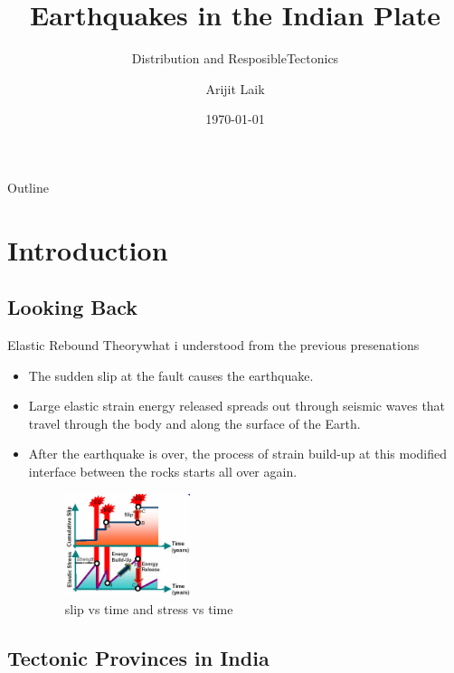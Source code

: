\documentclass[smaller]{beamer}
\title{Earthquakes in the Indian Plate}
\subtitle{Distribution and ResposibleTectonics}
\author[a class presentation by Arijit Laik]{Arijit Laik}
\institute[ Presidency University Kolkata ] %
{
  UG Semester VI\\
  Department of Geology\\
  Presidency University Kolkata 
}
\date{\today}
\begin{document}
\begin{frame}
  \titlepage
\end{frame}

\begin{frame}{Outline}
  \tableofcontents
\end{frame}

\section{Introduction}

\subsection{Looking Back}

\begin{frame}{Elastic Rebound Theory}{what i understood from the previous presenations}
  \begin{itemize}
  \item 
   The sudden slip at the fault causes the earthquake.
  \item 
    Large elastic strain energy released spreads out through seismic waves that travel through the body and along the surface of the Earth.
  \item
	After the earthquake is over, the process of strain build-up at this modified interface between the rocks starts all over again.
\begin{figure}{
\includegraphics[height=3cm]{erb.png}
\caption{slip vs time and stress vs time}}
\end{figure}
  \end{itemize}
 
\end{frame}

\subsection{Tectonic Provinces in India}
\end{document}
